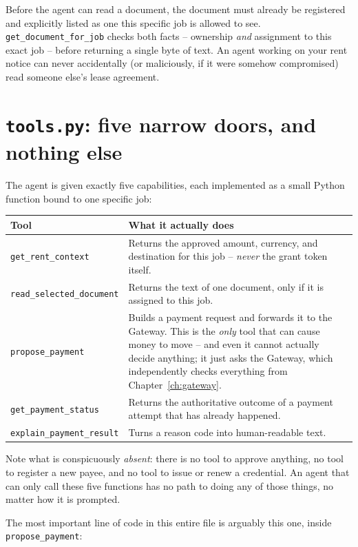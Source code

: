 \documentclass[11pt]{report}
\newcommand{\file}[1]{\texttt{#1}}
\newcommand{\code}[1]{\texttt{#1}}
\begin{document}
Before the agent can read a document, the document must already be
registered and explicitly listed as one this specific job is allowed to
see. \code{get\_document\_for\_job} checks both facts -- ownership
\emph{and} assignment to this exact job -- before returning a single
byte of text. An agent working on your rent notice can never accidentally
(or maliciously, if it were somehow compromised) read someone else's
lease agreement.

\section{\file{tools.py}: five narrow doors, and nothing else}

The agent is given exactly five capabilities, each implemented as a small
Python function bound to one specific job:

\begin{center}
\begin{tabular}{@{}p{4.8cm}p{8.7cm}@{}}
\toprule
\textbf{Tool} & \textbf{What it actually does} \\
\midrule
\code{get\_rent\_context} & Returns the approved amount, currency, and
  destination for this job -- \emph{never} the grant token itself. \\
\code{read\_selected\_document} & Returns the text of one document, only
  if it is assigned to this job. \\
\code{propose\_payment} & Builds a payment request and forwards it to the
  Gateway. This is the \emph{only} tool that can cause money to move --
  and even it cannot actually decide anything; it just asks the Gateway,
  which independently checks everything from Chapter~\ref{ch:gateway}. \\
\code{get\_payment\_status} & Returns the authoritative outcome of a
  payment attempt that has already happened. \\
\code{explain\_payment\_result} & Turns a reason code into human-readable
  text. \\
\bottomrule
\end{tabular}
\end{center}

Note what is conspicuously \emph{absent}: there is no tool to approve
anything, no tool to register a new payee, and no tool to issue or renew
a credential. An agent that can only call these five functions has no
path to doing any of those things, no matter how it is prompted.

The most important line of code in this entire file is arguably this one,
inside \code{propose\_payment}:
\end{document}
